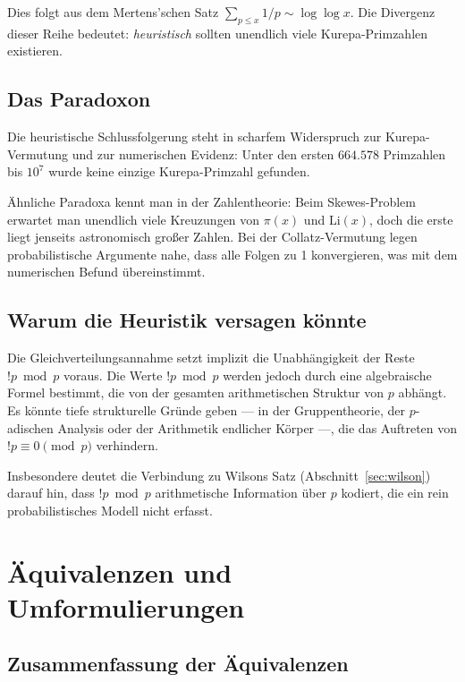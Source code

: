 \documentclass[12pt,a4paper]{amsart}
\theoremstyle{definition}
\begin{document}
Dies folgt aus dem Mertens'schen Satz
$\sum_{p \leq x} 1/p \sim \log\log x$.
Die Divergenz dieser Reihe bedeutet: \emph{heuristisch} sollten unendlich
viele Kurepa-Primzahlen existieren.

\subsection{Das Paradoxon}

Die heuristische Schlussfolgerung steht in scharfem Widerspruch zur
Kurepa-Vermutung und zur numerischen Evidenz:
Unter den ersten $664{.}578$ Primzahlen bis $10^7$ wurde keine einzige
Kurepa-Primzahl gefunden.

Ähnliche Paradoxa kennt man in der Zahlentheorie:
Beim Skewes-Problem erwartet man unendlich viele Kreuzungen von $\pi(x)$ und
$\mathrm{Li}(x)$, doch die erste liegt jenseits astronomisch großer Zahlen.
Bei der Collatz-Vermutung legen probabilistische Argumente nahe, dass alle
Folgen zu 1 konvergieren, was mit dem numerischen Befund übereinstimmt.

\subsection{Warum die Heuristik versagen könnte}

Die Gleichverteilungsannahme setzt implizit die Unabhängigkeit der Reste
$!p \bmod p$ voraus.
Die Werte $!p \bmod p$ werden jedoch durch eine algebraische Formel bestimmt,
die von der gesamten arithmetischen Struktur von $p$ abhängt.
Es könnte tiefe strukturelle Gründe geben --- in der Gruppentheorie, der
$p$-adischen Analysis oder der Arithmetik endlicher Körper ---,
die das Auftreten von $!p \equiv 0 \pmod p$ verhindern.

Insbesondere deutet die Verbindung zu Wilsons Satz (Abschnitt~\ref{sec:wilson})
darauf hin, dass $!p \bmod p$ arithmetische Information über $p$ kodiert,
die ein rein probabilistisches Modell nicht erfasst.

\section{Äquivalenzen und Umformulierungen}
\label{sec:aequivalenzen}

\subsection{Zusammenfassung der Äquivalenzen}
\end{document}
